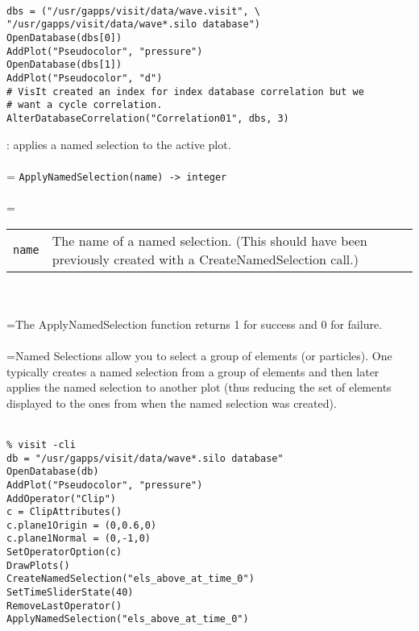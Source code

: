 \documentclass[10pt,a4paper]{report}
\begin{document}
\\[-6mm]
\begin{verbatim}dbs = ("/usr/gapps/visit/data/wave.visit", \
"/usr/gapps/visit/data/wave*.silo database")
OpenDatabase(dbs[0])
AddPlot("Pseudocolor", "pressure")
OpenDatabase(dbs[1])
AddPlot("Pseudocolor", "d")
# VisIt created an index for index database correlation but we 
# want a cycle correlation.
AlterDatabaseCorrelation("Correlation01", dbs, 3)
\end{verbatim}
\newpage


{}
: applies a named selection to the active plot.\\[-3mm]

 \\ 
\hangindent=\parindent 
\verb!ApplyNamedSelection(name) -> integer!\\ [-3mm]

 \\ 
\hangindent=\parindent 
\begin{tabular}{lp{9cm}}
\verb!name! & The name of a named selection.  (This should have been previously created with a CreateNamedSelection call.) \\
\end{tabular} \\[-2mm]


 \\ 
\hangindent=\parindent The ApplyNamedSelection function returns 1 for success and 0 for failure. \\[-3mm] 

 \\ 
\hangindent=\parindent Named Selections allow you to select a group of elements (or particles). One typically creates a named selection from a group of elements and then later applies the named selection to another plot (thus reducing the set of elements displayed to the ones from when the named selection was created). \\[-3mm] 

\\[-6mm]
\begin{verbatim}% visit -cli
db = "/usr/gapps/visit/data/wave*.silo database"
OpenDatabase(db)
AddPlot("Pseudocolor", "pressure")
AddOperator("Clip")
c = ClipAttributes()
c.plane1Origin = (0,0.6,0)
c.plane1Normal = (0,-1,0)
SetOperatorOption(c)
DrawPlots()
CreateNamedSelection("els_above_at_time_0")
SetTimeSliderState(40)
RemoveLastOperator()
ApplyNamedSelection("els_above_at_time_0")
\end{verbatim}
\newpage
\end{document}
